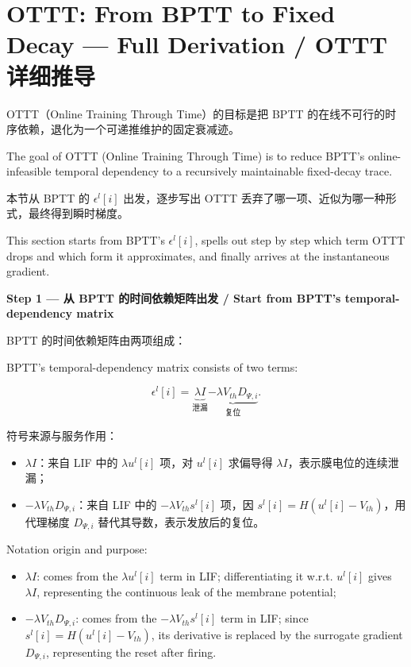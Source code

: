 \documentclass[journal,12pt,onecolumn]{IEEEtran}
\begin{document}
\section{OTTT: From BPTT to Fixed Decay — Full Derivation / OTTT 详细推导}

OTTT（Online Training Through Time）的目标是把 BPTT 的在线不可行的时序依赖，退化为一个可递推维护的固定衰减迹。

The goal of OTTT (Online Training Through Time) is to reduce BPTT's online-infeasible temporal dependency to a recursively maintainable fixed-decay trace.

本节从 BPTT 的 $\epsilon^l[i]$ 出发，逐步写出 OTTT 丢弃了哪一项、近似为哪一种形式，最终得到瞬时梯度。

This section starts from BPTT's $\epsilon^l[i]$, spells out step by step which term OTTT drops and which form it approximates, and finally arrives at the instantaneous gradient.

\medskip\noindent\textbf{Step 1 — 从 BPTT 的时间依赖矩阵出发 / Start from BPTT's temporal-dependency matrix}

BPTT 的时间依赖矩阵由两项组成：

BPTT's temporal-dependency matrix consists of two terms:

\begin{equation}
\epsilon^l[i] = \underbrace{\lambda I}_{\text{泄漏}} \underbrace{- \lambda V_{th} D_{\Psi,i}}_{\text{复位}}.
\end{equation}

符号来源与服务作用：
\begin{itemize}[leftmargin=1.5em,itemsep=2pt]
\item $\lambda I$：来自 LIF 中的 $\lambda u^l[i]$ 项，对 $u^l[i]$ 求偏导得 $\lambda I$，表示膜电位的连续泄漏；
\item $-\lambda V_{th} D_{\Psi,i}$：来自 LIF 中的 $-\lambda V_{th} s^l[i]$ 项，因 $s^l[i]=H(u^l[i]-V_{th})$，用代理梯度 $D_{\Psi,i}$ 替代其导数，表示发放后的复位。
\end{itemize}

Notation origin and purpose:
\begin{itemize}[leftmargin=1.5em,itemsep=2pt]
\item $\lambda I$: comes from the $\lambda u^l[i]$ term in LIF; differentiating it w.r.t. $u^l[i]$ gives $\lambda I$, representing the continuous leak of the membrane potential;
\item $-\lambda V_{th} D_{\Psi,i}$: comes from the $-\lambda V_{th} s^l[i]$ term in LIF; since $s^l[i]=H(u^l[i]-V_{th})$, its derivative is replaced by the surrogate gradient $D_{\Psi,i}$, representing the reset after firing.
\end{itemize}
\end{document}
